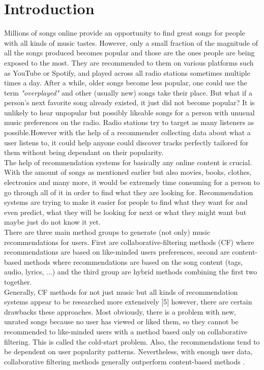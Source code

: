 \chapter{Introduction}

Millions of songs online provide an opportunity to find great songs for people with all kinds of music tastes. However, only a small fraction of the magnitude of all the songs produced becomes popular and those are the ones people are being exposed to the most.  They are recommended to them on various platforms such as YouTube or Spotify, and played across all radio stations sometimes multiple times a day. After a while, older songs become less popular, one could use the term \textit{"overplayed"} and other (usually new) songs take their place. But what if a person's next favorite song already existed, it just did not become popular? It is unlikely to hear unpopular but possibly likeable songs for a person with unusual music preferences on the radio. Radio stations try to target as many listeners as possible.However with the help of a recommender collecting data about what a user listens to, it could help anyone could discover tracks perfectly tailored for them without being dependant on their popularity. \\
The help of recommendation systems for basically any online content is crucial. With the amount of songs as mentioned earlier but also movies, books, clothes, electronics and many more, it would be extremely time consuming for a person to go through all of it in order to find what they are looking for. Recommendation systems are trying to make it easier for people to find what they want for and even predict, what they will be looking for next or what they might want but maybe just do not know it yet. \\
There are three main method groups to generate (not only) music recommendations for users. First are collaborative-filtering methods (CF) where recommendations are based on like-minded users preferences, second are content-based methods where recommendations are based on the song content (tags, audio, lyrics, ...) and the third group are hybrid methods combining the first two together. \\
Generally, CF methods for not just music but all kinds of recommendation systems appear to be researched more extensively [5] however, there are certain drawbacks these approaches. Most obviously, there is a problem with new, unrated songs because no user has viewed or liked them, so they cannot be recommended to like-minded users with a method based only on collaborative filtering. This is called the cold-start problem. Also, the recommendations tend to be dependent on user popularity patterns. Nevertheless, with enough user data, collaborative filtering methods generally outperform content-based methods \cite{van2013deep}. \\
